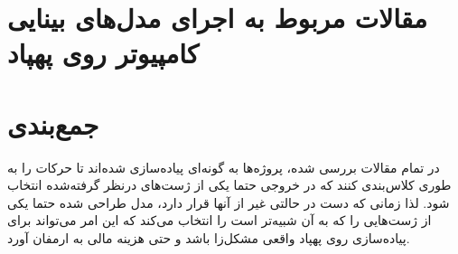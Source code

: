 \section{مقالات مربوط به اجرای مدل‌های بینایی کامپیوتر روی پهپاد}


\section{جمع‌بندی}


در تمام مقالات بررسی شده، پروژه‌ها به گونه‌ای پیاده‌سازی شده‌اند تا حرکات را به طوری کلاس‌بندی کنند که در خروجی حتما یکی از ژست‌های درنظر گرفته‌شده انتخاب شود. لذا زمانی که دست در حالتی غیر از آنها قرار دارد، مدل طراحی شده حتما یکی از ژست‌هایی را که به آن شبیه‌تر است را انتخاب می‌کند که این امر می‌تواند برای پیاده‌سازی روی پهپاد واقعی مشکل‌زا باشد و حتی هزینه مالی به ارمفان آورد.
